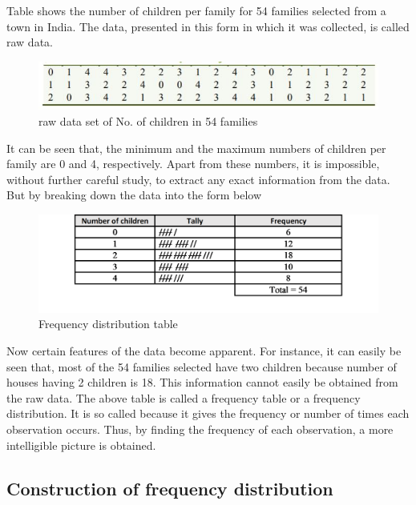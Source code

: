 \documentclass[
]{book}
\begin{document}
Table shows the number of children per family for 54 families selected from a town in India. The data, presented in this form in which it was collected, is called raw data.\\

\begin{figure}

{\centering \includegraphics[width=0.7\linewidth]{images/image3} 

}

\caption{raw data set of No. of children in 54 families}\label{fig:raw}
\end{figure}

It can be seen that, the minimum and the maximum numbers of children per family are 0 and 4, respectively. Apart from these numbers, it is impossible, without further careful study, to extract any exact information from the data. But by breaking down the data into the form below\\

\begin{figure}

{\centering \includegraphics[width=0.7\linewidth]{images/image4} 

}

\caption{Frequency distribution table}\label{fig:freq}
\end{figure}

Now certain features of the data become apparent. For instance, it can easily be seen that, most of the 54 families selected have two children because number of houses having 2 children is 18. This information cannot easily be obtained from the raw data. The above table is called a frequency table or a frequency distribution. It is so called because it gives the frequency or number of times each
observation occurs. Thus, by finding the frequency of each observation, a more intelligible picture is obtained.

\hypertarget{construction-of-frequency-distribution}{%
\subsection{Construction of frequency distribution}\label{construction-of-frequency-distribution}}
\end{document}
